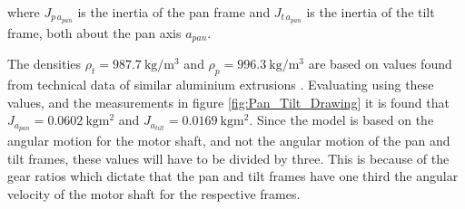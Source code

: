\documentclass[../../main.tex]{subfiles}
\begin{document}
where $J_{p\,a_{pan}}$ is the inertia of the pan frame and $J_{t\,a_{pan}}$ is the inertia of the tilt frame, both about the pan axis $a_{pan}$.

The densities $\rho_t = \SI{987.7 }{\kilo \gram \per \cubic \meter }$ and $\rho_p = \SI{996.3 }{\kilo \gram \per \cubic \meter } $ are based on values found from technical data of similar aluminium extrusions \cite{extrusion45x45} \cite{extrusion40x40}.
Evaluating using these values, and the measurements in figure \ref{fig:Pan_Tilt_Drawing} it is found that $J_{a_{pan}} = \SI{0.0602}{\kilo \gram \square \meter } $ and $J_{a_{tilt}} = \SI{0.0169}{\kilo \gram \square \meter }$. Since the model is based on the angular motion for the motor shaft, and not the angular motion of the pan and tilt frames, these values will have to be divided by three. This is because of the gear ratios which dictate that the pan and tilt frames have one third the angular velocity of the motor shaft for the respective frames.
\end{document}
